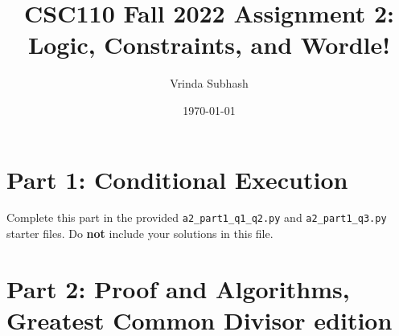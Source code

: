 \documentclass[11pt]{article}
\title{CSC110 Fall 2022 Assignment 2: Logic, Constraints, and Wordle!}
\author{Vrinda Subhash}
\date{\today}
\begin{document}
\maketitle

\section*{Part 1: Conditional Execution}

Complete this part in the provided \texttt{a2\_part1\_q1\_q2.py} and \texttt{a2\_part1\_q3.py} starter files.
Do \textbf{not} include your solutions in this file.

\section*{Part 2: Proof and Algorithms, Greatest Common Divisor edition}
\end{document}
